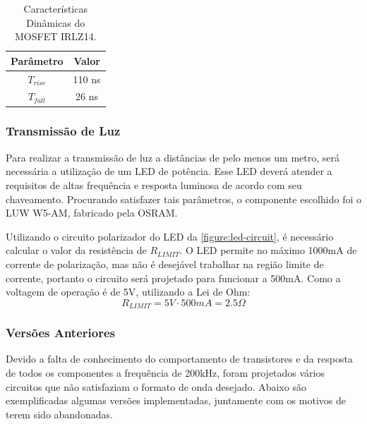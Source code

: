 	\begin{table}[h]
		\caption{Características Dinâmicas do MOSFET IRLZ14.}
		\centering
		\begin{tabular}{c c}
			\hline
			Parâmetro  & Valor  \\ \hline
			$T_{rise}$ & 110 ns \\
			$T_{fall}$ & 26 ns  \\ \hline
		\end{tabular}
		\label{table:irlz14-timing}
	\end{table}

	\subsubsection{Transmissão de Luz}
		
	Para realizar a transmissão de luz a distâncias de pelo menos um metro, será necessária a utilização de um LED de potência. Esse LED deverá atender a requisitos de altas frequência e resposta luminosa de acordo com seu chaveamento. Procurando satisfazer tais parâmetros, o componente escolhido foi o LUW W5-AM, fabricado pela OSRAM.

	Utilizando o circuito polarizador do LED da \autoref{figure:led-circuit}, é necessário calcular o valor da resistência de $R_{LIMIT}$. O LED permite no máximo 1000mA de corrente de polarização, mas não é desejável trabalhar na região limite de corrente, portanto o circuito será projetado para funcionar a 500mA. Como a voltagem de operação é de 5V, utilizando a Lei de Ohm:
	\begin{equation}
	R_{LIMIT} = 5V \cdot 500mA = 2.5\Omega
	\end{equation}
	
	\subsubsection{Versões Anteriores}
	
	Devido a falta de conhecimento do comportamento de transistores e da resposta de todos os componentes a frequência de 200kHz, foram projetados vários circuitos que não satisfaziam o formato de onda desejado. Abaixo são exemplificadas algumas versões implementadas, juntamente com os motivos de terem sido abandonadas.
	
